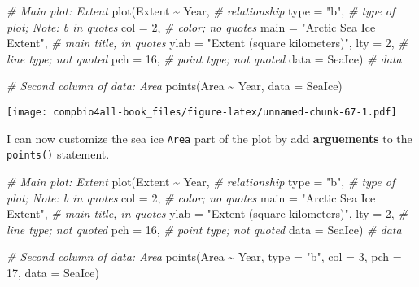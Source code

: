 \documentclass[
]{book}
\newenvironment{Shaded}{\begin{snugshade}}{\end{snugshade}}
\newcommand{\AttributeTok}[1]{\textcolor[rgb]{0.77,0.63,0.00}{#1}}
\newcommand{\CommentTok}[1]{\textcolor[rgb]{0.56,0.35,0.01}{\textit{#1}}}
\newcommand{\DecValTok}[1]{\textcolor[rgb]{0.00,0.00,0.81}{#1}}
\newcommand{\FunctionTok}[1]{\textcolor[rgb]{0.00,0.00,0.00}{#1}}
\newcommand{\NormalTok}[1]{#1}
\newcommand{\SpecialCharTok}[1]{\textcolor[rgb]{0.00,0.00,0.00}{#1}}
\newcommand{\StringTok}[1]{\textcolor[rgb]{0.31,0.60,0.02}{#1}}
\begin{document}
\begin{Shaded}
\begin{Highlighting}[]
\CommentTok{\# Main plot: Extent}
\FunctionTok{plot}\NormalTok{(Extent }\SpecialCharTok{\textasciitilde{}}\NormalTok{ Year,  }\CommentTok{\# relationship}
     \AttributeTok{type =} \StringTok{"b"}\NormalTok{,     }\CommentTok{\# type of plot; Note: b in quotes}
     \AttributeTok{col =} \DecValTok{2}\NormalTok{,        }\CommentTok{\# color; no quotes}
     \AttributeTok{main =} \StringTok{"Arctic Sea Ice Extent"}\NormalTok{, }\CommentTok{\# main title, in quotes}
     \AttributeTok{ylab =} \StringTok{"Extent (square kilometers)"}\NormalTok{,}
     \AttributeTok{lty =} \DecValTok{2}\NormalTok{,        }\CommentTok{\# line type; not quoted}
     \AttributeTok{pch =} \DecValTok{16}\NormalTok{,       }\CommentTok{\# point type; not quoted}
     \AttributeTok{data =}\NormalTok{ SeaIce)  }\CommentTok{\# data}

\CommentTok{\# Second column of data: Area}
\FunctionTok{points}\NormalTok{(Area }\SpecialCharTok{\textasciitilde{}}\NormalTok{ Year, }\AttributeTok{data =}\NormalTok{ SeaIce)}
\end{Highlighting}
\end{Shaded}

\texttt{[image: compbio4all-book\_files/figure-latex/unnamed-chunk-67-1.pdf]}

I can now customize the sea ice \texttt{Area} part of the plot by add \textbf{arguements} to the \texttt{points()} statement.

\begin{Shaded}
\begin{Highlighting}[]
\CommentTok{\# Main plot: Extent}
\FunctionTok{plot}\NormalTok{(Extent }\SpecialCharTok{\textasciitilde{}}\NormalTok{ Year,  }\CommentTok{\# relationship}
     \AttributeTok{type =} \StringTok{"b"}\NormalTok{,     }\CommentTok{\# type of plot; Note: b in quotes}
     \AttributeTok{col =} \DecValTok{2}\NormalTok{,        }\CommentTok{\# color; no quotes}
     \AttributeTok{main =} \StringTok{"Arctic Sea Ice Extent"}\NormalTok{, }\CommentTok{\# main title, in quotes}
     \AttributeTok{ylab =} \StringTok{"Extent (square kilometers)"}\NormalTok{,}
     \AttributeTok{lty =} \DecValTok{2}\NormalTok{,        }\CommentTok{\# line type; not quoted}
     \AttributeTok{pch =} \DecValTok{16}\NormalTok{,       }\CommentTok{\# point type; not quoted}
     \AttributeTok{data =}\NormalTok{ SeaIce)  }\CommentTok{\# data}

\CommentTok{\# Second column of data: Area}
\FunctionTok{points}\NormalTok{(Area }\SpecialCharTok{\textasciitilde{}}\NormalTok{ Year,}
       \AttributeTok{type =} \StringTok{"b"}\NormalTok{,}
       \AttributeTok{col =} \DecValTok{3}\NormalTok{,}
       \AttributeTok{pch =} \DecValTok{17}\NormalTok{,}
       \AttributeTok{data =}\NormalTok{ SeaIce)}
\end{Highlighting}
\end{Shaded}
\end{document}
